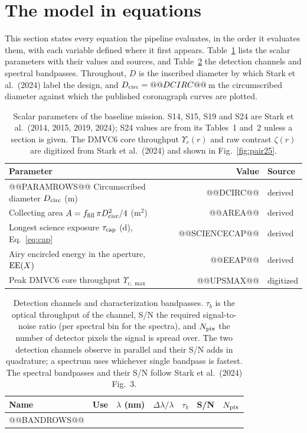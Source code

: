 \documentclass[11pt,a4paper]{article}
\begin{document}
\section{The model in equations}
\label{sec:equations}

This section states every equation the pipeline evaluates, in the order it evaluates them, with
each variable defined where it first appears. Table~\ref{tab:params} lists the scalar parameters
with their values and sources, and Table~\ref{tab:bands} the detection channels and spectral
bandpasses. Throughout, $D$ is the inscribed diameter by which Stark et al.\ (2024) label the
design, and $D_{\rm circ} = @@DCIRC@@$\,m the circumscribed diameter against which the published
coronagraph curves are plotted.

\begin{table}[htbp]
\centering
\scriptsize
\begin{tabular}{p{8.2cm}rp{3.6cm}}
\toprule
\textbf{Parameter} & \textbf{Value} & \textbf{Source} \\
\midrule
@@PARAMROWS@@
\midrule
Circumscribed diameter $D_{\rm circ}$ (m) & @@DCIRC@@ & derived \\
Collecting area $A = f_{\rm fill}\,\pi D_{\rm circ}^2/4$ (m$^2$) & @@AREA@@ & derived \\
Longest science exposure $\tau_{\rm cap}$ (d), Eq.~\eqref{eq:cap} & @@SCIENCECAP@@ & derived \\
Airy encircled energy in the aperture, ${\rm EE}(X)$ & @@EEAP@@ & derived \\
Peak DMVC6 core throughput $\Upsilon_{c,\max}$ & @@UPSMAX@@ & digitized \\
\bottomrule
\end{tabular}
\caption{Scalar parameters of the baseline mission. S14, S15, S19 and S24 are Stark et al.\
(2014, 2015, 2019, 2024); S24 values are from its Tables~1 and~2 unless a section is given. The
DMVC6 core throughput $\Upsilon_c(r)$ and raw contrast $\zeta(r)$ are digitized from Stark et al.\
(2024) and shown in Fig.~\ref{fig:pair25}.}
\label{tab:params}
\end{table}

\begin{table}[htbp]
\centering
\small
\begin{tabular}{llrrrrr}
\toprule
\textbf{Name} & \textbf{Use} & $\lambda$ \textbf{(nm)} & $\Delta\lambda/\lambda$ & $\tau_b$ &
\textbf{S/N} & $N_{\rm pix}$ \\
\midrule
@@BANDROWS@@
\bottomrule
\end{tabular}
\caption{Detection channels and characterization bandpasses. $\tau_b$ is the optical throughput
of the channel, S/N the required signal-to-noise ratio (per spectral bin for the spectra), and
$N_{\rm pix}$ the number of detector pixels the signal is spread over. The two detection channels
observe in parallel and their S/N adds in quadrature; a spectrum uses whichever single bandpass
is fastest. The spectral bandpasses and their S/N follow Stark et al.\ (2024) Fig.~3.}
\label{tab:bands}
\end{table}
\end{document}
